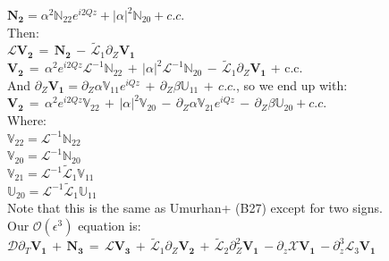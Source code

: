 \documentclass[letterpaper,12pt]{article}
\begin{document}
$\mathbf{N_2} = \alpha^2\mathbb{N}_{22} e^{i2Qz} + \left|\alpha\right|^2 \mathbb{N}_{20} + c.c.$ \\

Then: \\

$\mathcal{L}\mathbf{V_2} \, = \, \mathbf{N_2} \, - \, \widetilde{\mathcal{L}}_1 \partial_Z \mathbf{V_1}$ \\

$\mathbf{V_2} \, = \, \alpha^2 e^{i2Qz} \mathcal{L}^{-1}\mathbb{N}_{22} \, + \,  \left|\alpha\right|^2 \mathcal{L}^{-1} \mathbb{N}_{20}\, - \, \widetilde{\mathcal{L}}_1 \partial_Z \mathbf{V_1}$ + c.c.\\

And $\partial_Z \mathbf{V_1} = \partial_Z \alpha \mathbb{V}_{11} e^{i Q z} \, + \, \partial_Z \beta \mathbb{U}_{11} \, + \, c.c.$, so we end up with: \\

$\mathbf{V_2} \, = \, \alpha^2 e^{i2Qz} \mathbb{V}_{22} \, + \, \left|\alpha\right|^2 \mathbb{V}_{20} \, - \, \partial_Z \alpha \mathbb{V}_{21} e^{iQz} \, - \, \partial_Z \beta \mathbb{U}_{20} + c.c.$ \\

Where: \\

$\mathbb{V}_{22} = \mathcal{L}^{-1}\mathbb{N}_{22}$ \\

$\mathbb{V}_{20} = \mathcal{L}^{-1} \mathbb{N}_{20}$ \\

$\mathbb{V}_{21} = \mathcal{L}^{-1} \widetilde{\mathcal{L}}_1 \mathbb{V}_{11}$ \\

$\mathbb{U}_{20} = \mathcal{L}^{-1} \widetilde{\mathcal{L}}_1 \mathbb{U}_{11}$ \\

Note that this is the same as Umurhan+ (B27) except for two signs. \\

Our $\mathcal{O}(\epsilon^3)$ equation is: \\

$\mathcal{D}\partial_T \mathbf{V_1} \, + \, \mathbf{N_3} \, = \, \mathcal{L} \mathbf{V_3} \, + \, \widetilde{\mathcal{L}}_1\partial_Z\mathbf{V_2} \, + \, \widetilde{\mathcal{L}}_2\partial_Z^2\mathbf{V_1} \, - \partial_z\mathcal{X}\mathbf{V_1} \, - \partial_z^3\mathcal{L}_3\mathbf{V_1}$ \\
\end{document}

